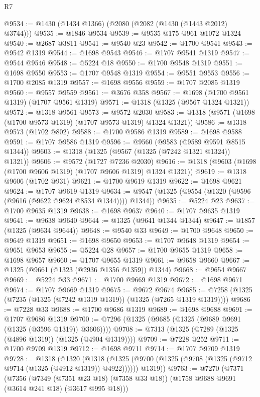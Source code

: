 \begin{lexlean}{R7}
\begin{coremodule}
@9534 := @1430 (@1434 @1366) (@2080 (@2082 (@1430 (@1443 @2012) @3744)))
@9535 := @1846 @9534
@9539 := @9535 @175 @961 @1072 @1324
@9540 := @2687 @3811
@9541 := @9540 @23
@9542 := @1700 @9541
@9543 := @9542 @1319
@9544 := @1698 @9543
@9546 := @1707 @9541 @1319
@9547 := @9544 @9546
@9548 := @5224 @18
@9550 := @1700 @9548 @1319
@9551 := @1698 @9550
@9553 := @1707 @9548 @1319
@9554 := @9551 @9553
@9556 := @1700 @2085 @1319
@9557 := @1698 @9556
@9559 := @1707 @2085 @1319
@9560 := @9557 @9559
@9561 := @3676 @358
@9567 := @1698 (@1700 @9561 @1319) (@1707 @9561 @1319)
@9571 := @1318 (@1325 (@9567 @1324 @1321))
@9572 := @1318 @9561
@9573 := @9572 @2030
@9583 := @1318 (@9571 (@1698 (@1700 @9573 @1319) (@1707 @9573 @1319) @1324 @1321))
@9586 := @1318 @9573 (@1702 @802)
@9588 := @1700 @9586 @1319
@9589 := @1698 @9588
@9591 := @1707 @9586 @1319
@9596 := @9560 (@9583 (@9589 @9591 @8515 @1344))
@9603 := @1318 (@1325 (@9567 (@1325 (@7242 @1321 @1324)) @1321))
@9606 := @9572 (@1727 @7236 @2030)
@9616 := @1318 (@9603 (@1698 (@1700 @9606 @1319) (@1707 @9606 @1319) @1324 @1321))
@9619 := @1318 @9606 (@1702 @931)
@9621 := @1700 @9619 @1319
@9622 := @1698 @9621
@9624 := @1707 @9619 @1319
@9634 := @9547 (@1325 (@9554 (@1320 (@9596 (@9616 (@9622 @9624 @8534 @1344)))) @1344))
@9635 := @5224 @23
@9637 := @1700 @9635 @1319
@9638 := @1698 @9637
@9640 := @1707 @9635 @1319
@9641 := @9638 @9640
@9644 := @1325 (@9641 @1344 @1344)
@9647 := @1857 (@1325 (@9634 @9644))
@9648 := @9540 @33
@9649 := @1700 @9648
@9650 := @9649 @1319
@9651 := @1698 @9650
@9653 := @1707 @9648 @1319
@9654 := @9651 @9653
@9655 := @5224 @28
@9657 := @1700 @9655 @1319
@9658 := @1698 @9657
@9660 := @1707 @9655 @1319
@9661 := @9658 @9660
@9667 := @1325 (@9661 (@1323 (@2936 @1356 @1359)) @1344)
@9668 := @9654 @9667
@9669 := @5224 @33
@9671 := @1700 @9669 @1319
@9672 := @1698 @9671
@9674 := @1707 @9669 @1319
@9675 := @9672 @9674
@9685 := @7258 (@1325 (@7235 (@1325 (@7242 @1319 @1319)) (@1325 (@7265 @1319 @1319))))
@9686 := @7228 @33
@9688 := @1700 @9686 @1319
@9689 := @1698 @9688
@9691 := @1707 @9686 @1319
@9700 := @7296 (@1325 (@9685 (@1325 (@9689 @9691 (@1325 (@3596 @1319)) @3606))))
@9708 := @7313 (@1325 (@7289 (@1325 (@4896 @1319)) (@1325 (@4904 @1319))))
@9709 := @7228 @252
@9711 := @1700 @9709 @1319
@9712 := @1698 @9711
@9714 := @1707 @9709 @1319
@9728 := @1318
    (@1320
      (@1318
        (@1325 (@9700 (@1325 (@9708 (@1325 (@9712 @9714 (@1325 (@4912 @1319)) @4922))))))
        @1319))
@9763 := @7270
    (@7371
      (@7356
        (@7349 (@7351 @23 @18) (@7358 @33 @18))
        (@1758 @9688 @9691 (@3614 @241 @18) (@3617 @995 @18)))

\end{coremodule}
\end{lexlean}
